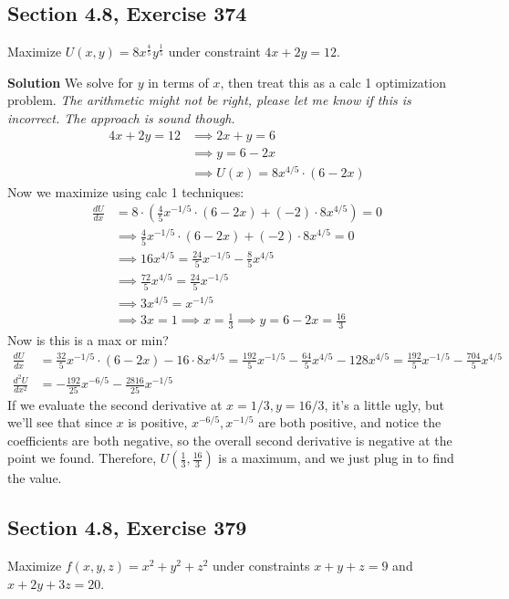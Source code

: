 \documentclass[]{mangos-musings}
\begin{document}
\subsection*{Section 4.8, Exercise 374}
Maximize $U(x, y) = 8x^{\frac{4}{5}} y^{\frac{1}{5}}$ under constraint $4x + 2y = 12$.

\textbf{Solution} We solve for $y$ in terms of $x$, then treat this as a calc 1 optimization problem.
\textit{The arithmetic might not be right, please let me know if this is incorrect. The approach is sound though.}
\begin{align*}
  4x + 2y = 12 & \implies 2x + y = 6
  \\ & \implies y = 6 - 2x 
  \\ & \implies U(x) = 8x^{4/5}\cdot (6 - 2x)
\end{align*}
Now we maximize using calc 1 techniques:
\begin{align*}
  \frac{dU}{dx} &= 8 \cdot\left( \frac{4}{5}x^{-1/5} \cdot (6 - 2x) + (-2)\cdot 8x^{4/5}\right) = 0
  \\ &\implies \frac{4}{5}x^{-1/5} \cdot (6 - 2x) + (-2)\cdot 8x^{4/5} = 0
  \\ &\implies 16x^{4/5} = \frac{24}{5}x^{-1/5} - \frac{8}{5}x^{4/5}
  \\ &\implies \frac{72}{5}x^{4/5} = \frac{24}{5}x^{-1/5}
  \\ &\implies 3x^{4/5} = x^{-1/5}
  \\ &\implies 3x = 1 \implies x = \frac{1}{3} \implies y = 6 - 2x = \frac{16}{3}
\end{align*}
Now is this is a max or min?
\begin{align*}
  \frac{dU}{dx} &= \frac{32}{5}x^{-1/5} \cdot (6 - 2x) -16\cdot 8x^{4/5} = \frac{192}{5}x^{-1/5} - \frac{64}{5}x^{4/5} - 128 x^{4/5} = \frac{192}{5}x^{-1/5} - \frac{704}{5}x^{4/5}
  \\ \frac{d^2U}{dx^2} &= -\frac{192}{25}x^{-6/5} - \frac{2816}{25}x^{-1/5}
\end{align*}
If we evaluate the second derivative at $x =1/3, y = 16/3$, it's a little ugly, but we'll see that since $x$ is positive, $x^{-6/5}, x^{-1/5}$ are both positive, and notice the coefficients are both negative, so the overall second derivative is negative at the point we found. Therefore, $U\left(\frac{1}{3}, \frac{16}{3}\right)$ is a maximum, and we just plug in to find the value.

\newpage
\subsection*{Section 4.8, Exercise 379}
Maximize $f(x, y, z) = x^2 + y^2 + z^2$ under constraints $x + y + z = 9$ and $x + 2y + 3z = 20$.
\end{document}
